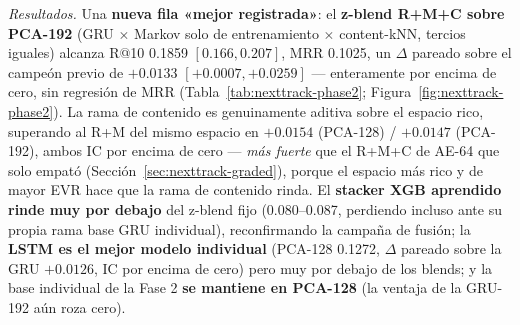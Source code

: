 \documentclass[11pt]{article}
\begin{document}
\emph{Resultados.} Una \textbf{nueva fila «mejor registrada»}: el \textbf{z-blend
R+M+C sobre PCA-192} (GRU $\times$ Markov solo de entrenamiento $\times$ content-kNN,
tercios iguales) alcanza R@10 \num{0.1859} $[0.166, 0.207]$, MRR \num{0.1025}, un
$\Delta$ pareado sobre el campeón previo de $+\num{0.0133}$ $[+0.0007, +0.0259]$ ---
enteramente por encima de cero, sin regresión de MRR
(Tabla~\ref{tab:nexttrack-phase2}; Figura~\ref{fig:nexttrack-phase2}). La rama de
contenido es genuinamente aditiva sobre el espacio rico, superando al R+M del mismo
espacio en $+\num{0.0154}$ (PCA-128) / $+\num{0.0147}$ (PCA-192), ambos IC por
encima de cero --- \emph{más fuerte} que el R+M+C de AE-64 que solo empató
(Sección~\ref{sec:nexttrack-graded}), porque el espacio más rico y de mayor EVR hace
que la rama de contenido rinda. El \textbf{stacker XGB aprendido rinde muy por
debajo} del z-blend fijo (\num{0.080}--\num{0.087}, perdiendo incluso ante su propia
rama base GRU individual), reconfirmando la campaña de fusión; la \textbf{LSTM es el
mejor modelo individual} (PCA-128 \num{0.1272}, $\Delta$ pareado sobre la GRU
$+\num{0.0126}$, IC por encima de cero) pero muy por debajo de los blends; y la base
individual de la Fase 2 \textbf{se mantiene en PCA-128} (la ventaja de la GRU-192
aún roza cero).
\end{document}
